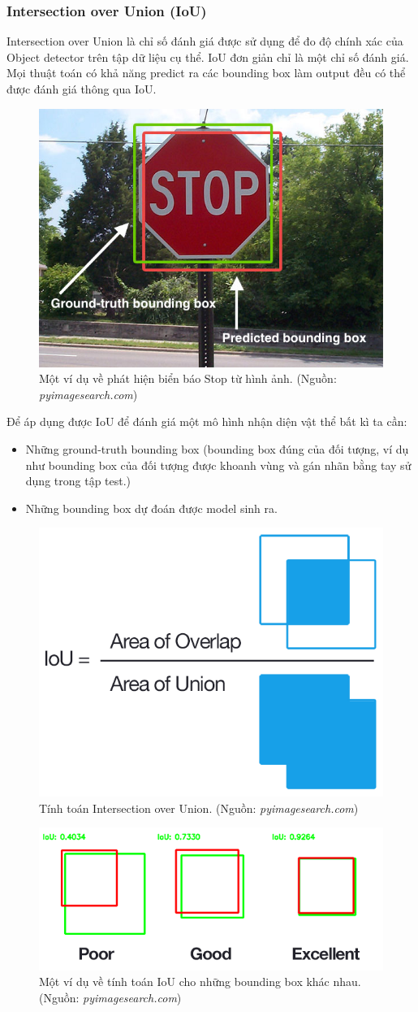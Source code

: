 \documentclass[a4paper, 12pt]{report}
\begin{document}
\subsubsection{Intersection over Union (IoU)}
Intersection over Union là chỉ số đánh giá được sử dụng để đo độ chính xác của Object detector trên tập dữ liệu cụ thể. IoU đơn giản chỉ là một chỉ số đánh giá. Mọi thuật toán có khả năng predict ra các bounding box làm output đều có thể được đánh giá thông qua IoU. \par
\begin{figure}[!h]
	\centering
	\includegraphics[width=0.5\linewidth]{Images/iou1}
	\caption{Một ví dụ về phát hiện biển báo Stop từ hình ảnh. (Nguồn: \textit{pyimagesearch.com})}
	\label{fig:iou1}
\end{figure}
Để áp dụng được IoU để đánh giá một mô hình nhận diện vật thể bất kì ta cần:
\begin{itemize}
	\item Những ground-truth bounding box (bounding box đúng của đối tượng, ví dụ như bounding box của đối tượng được khoanh vùng và gán nhãn bằng tay sử dụng trong tập test.)
	\item Những bounding box dự đoán được model sinh ra.
\end{itemize}
\begin{figure}[!h]
	\centering
	\includegraphics[width=0.5\linewidth]{Images/iou3}
	\caption{Tính toán Intersection over Union. (Nguồn: \textit{pyimagesearch.com})}
	\label{fig:iou3}
\end{figure}
\begin{figure}[!h]
	\centering
	\includegraphics[width=0.7\linewidth]{Images/iou4}
	\caption{Một ví dụ về tính toán IoU cho những bounding box khác nhau. (Nguồn: \textit{pyimagesearch.com})}
	\label{fig:iou4}
\end{figure}
\end{document}
